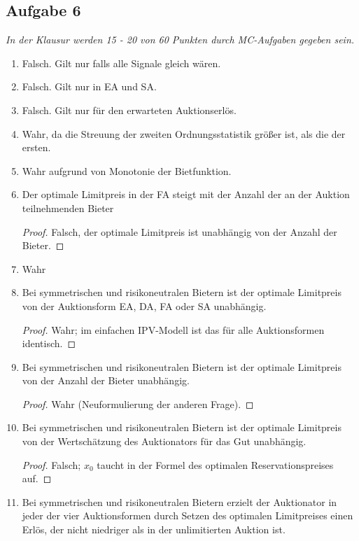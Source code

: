 \documentclass[12pt]{extreport} %
\theoremstyle{named}
\theoremstyle{nnamed}
\theoremstyle{itshape}
\theoremstyle{normal}
\begin{document}
\subsection*{Aufgabe 6}

\textit{In der Klausur werden 15 - 20 von 60 Punkten durch MC-Aufgaben gegeben sein.}

\begin{enumerate} 
	\item Falsch. Gilt nur falls alle Signale gleich wären.
	\item Falsch. Gilt nur in EA und SA.
	\item Falsch. Gilt nur für den erwarteten Auktionserlös.
	\item Wahr, da die Streuung der zweiten Ordnungsstatistik größer ist, als die der ersten.
	\item Wahr aufgrund von Monotonie der Bietfunktion.
	\item Der optimale Limitpreis in der FA steigt mit der Anzahl der an der Auktion teilnehmenden Bieter 
		\begin{proof}
			Falsch, der optimale Limitpreis ist unabhängig von der Anzahl der Bieter.	
		\end{proof} 
	\item Wahr
	\item Bei symmetrischen und risikoneutralen Bietern ist der optimale Limitpreis von der Auktionsform EA, DA, FA oder SA unabhängig.
		\begin{proof}
			Wahr; im einfachen IPV-Modell ist das für alle Auktionsformen identisch.
		\end{proof}
	\item Bei symmetrischen und risikoneutralen Bietern ist der optimale Limitpreis von der Anzahl der Bieter unabhängig.
		\begin{proof}
			Wahr (Neuformulierung der anderen Frage).
		\end{proof}
	\item Bei symmetrischen und risikoneutralen Bietern ist der optimale Limitpreis von der Wertschätzung des Auktionators für das Gut unabhängig.
		\begin{proof}
			Falsch; $x_{0}$ taucht in der Formel des optimalen Reservationspreises auf.
		\end{proof}
	\item Bei symmetrischen und risikoneutralen Bietern erzielt der Auktionator in jeder der vier Auktionsformen durch Setzen des optimalen Limitpreises einen Erlös, der nicht niedriger als in der unlimitierten Auktion ist.

\end{enumerate}
\end{document}
